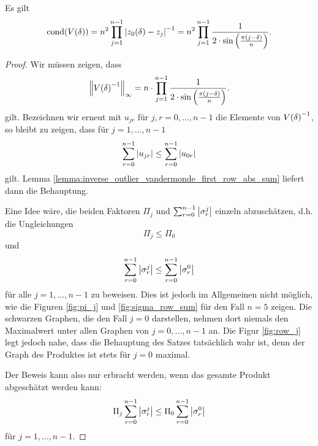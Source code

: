 \begin{theorem}
    Es gilt
    \begin{equation}
        \text{cond}\! \left(  V \! \left( \delta \right)  \right)
        = n^2 \prod_{j=1}^{n-1} \left\lvert  z_0(\delta) - z_j  \right\rvert^{-1}
        = n^2 \prod_{j=1}^{n-1} \frac{1}{2 \cdot \sin \left(\frac{\pi (j - \delta)}{n} \right)}.
    \end{equation}
\end{theorem}

\begin{proof}
    Wir müssen zeigen, dass
    \[
        \left\lVert V \! \left( \delta \right)^{-1} \right\rVert_\infty
        = n \cdot \prod_{j=1}^{n-1} \frac{1}{2 \cdot \sin \left(\frac{\pi (j - \delta)}{n} \right)}.
    \]
    gilt.
    Bezeichnen wir erneut mit $u_{jr}$ für $j,r = 0, \dots, n-1$ die Elemente von $V \! \left( \delta \right)^{-1}$,
    so bleibt zu zeigen, dass für $j = 1, \dots, n-1$
    \[
        \sum_{r=0}^{n-1} \left\lvert u_{jr} \right\rvert \leq \sum_{r=0}^{n-1} \left\lvert u_{0r} \right\rvert
    \]
    gilt.
    Lemma \ref{lemma:inverse_outlier_vandermonde_first_row_abs_sum} liefert dann die Behauptung.

    \noindent Eine Idee wäre, die beiden Faktoren $\Pi_j$ und
    $\sum_{r=0}^{n-1} \left\lvert \sigma_r^j \right\rvert$ einzeln abzuschätzen,
    d.h. die Ungleichungen
    \[
        \Pi_j \leq \Pi_0
    \]
    und
    \[
        \sum_{r=0}^{n-1} \left\lvert \sigma_r^j \right\rvert \leq \sum_{r=0}^{n-1} \left\lvert \sigma_r^0 \right\rvert
    \]
    für alle $ j=1, \dots, n-1$ zu beweisen.
    Dies ist jedoch im Allgemeinen nicht möglich, wie die Figuren
    \ref{fig:pi_j} und \ref{fig:sigma_row_sum} für den Fall $n=5$ zeigen.
    Die schwarzen Graphen, die den Fall $j=0$ darstellen, nehmen dort niemals
    den Maximalwert unter allen Graphen von $j=0, \dots, n-1$ an.
    Die Figur \ref{fig:row_j} legt jedoch nahe, dass die Behauptung des
    Satzes tatsächlich wahr ist, denn der Graph des Produktes ist stets für
    $j=0$ maximal.

    \noindent Der Beweis kann also nur erbracht werden, wenn das gesamte Produkt
    abgeschätzt werden kann:
    \[
        \Pi_j \sum_{r=0}^{n-1} \left\lvert \sigma_r^j \right\rvert \leq \Pi_0 \sum_{r=0}^{n-1} \left\lvert \sigma_r^0 \right\rvert
    \]
    für $j=1, \dots, n-1$.
\end{proof}

